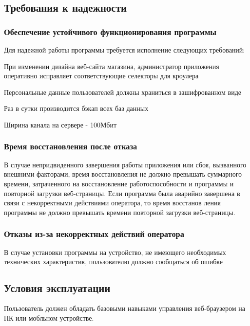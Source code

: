 \subsection{Требования к надежности}

\subsubsection{Обеспечение устойчивого функционирования программы}
Для надежной работы программы требуется исполнение следующих требований:
\begin{my_enumerate}
\item При изменении дизайна веб-сайта магазина, администратор приложения оперативно
исправляет соответствующие селекторы для кроулера
\item Персональные данные пользователей должны храниться в зашифрованном виде
\item Раз в сутки производится бэкап всех баз данных
\item Ширина канала на сервере - 100Мбит
\end{my_enumerate}

\subsubsection{Время восстановления после отказа}
В случае непридвиденного завершения работы приложения или сбоя, вызванного
внешними факторами, время восстановления не должно превышать суммарного времени,
затраченного на восстановление работоспособности и программы и повторной загрузки веб-страницы.
Если программа была аварийно завершена в связи с некорректными действиями оператора, 
то время восстанов ления программы не должно превышать времени повторной загрузки веб-страницы.

\subsubsection{Отказы из-за некорректных действий оператора}
В случае установки программы на устройство, не имеющего необходимых технических
характеристик, пользователю должно сообщаться об ошибке


\subsection{Условия эксплуатации}
Пользователь должен обладать базовыми навыками управления веб-браузером
на ПК или мобльном устройстве.


